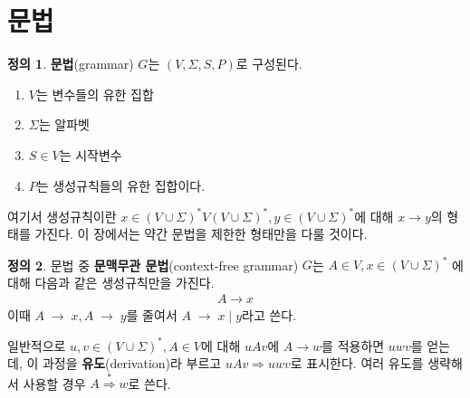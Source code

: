 \documentclass[b5paper, 11pt]{book}
\theoremstyle{definition}
\newtheorem{defn}{정의}[chapter]
\begin{document}
\section{문법}
\begin{defn}
    \textbf{문법}(grammar) $G$는 $(V, \Sigma, S, P)$로 구성된다.
\end{defn} 
\begin{enumerate}
    \item $V$는 변수들의 유한 집합
    \item $\Sigma$는 알파벳
    \item $S \in V$는 시작변수
    \item $P$는 생성규칙들의 유한 집합이다. 
\end{enumerate}
여기서 생성규칙이란 $x\in (V \cup \Sigma)^* V (V \cup \Sigma )^*, y \in (V \cup \Sigma)^*$에 대해 $x \rightarrow y$의 형태를 가진다. 이 장에서는 약간 문법을 제한한 형태만을 다룰 것이다. 
\begin{defn}
문법 중 \textbf{문맥무관 문법}(context-free grammar) $G$는 $A \in V, x \in (V \cup \Sigma)^*$ 에 대해 다음과 같은 생성규칙만을 가진다.
\begin{align*}
    A \rightarrow x
\end{align*}
이때 $A \; \rightarrow \; x, A\; \rightarrow \; y$를 줄여서 $A \; \rightarrow \; x \; \vert \; y $라고 쓴다.
\end{defn} 
일반적으로 $u, v \in (V \cup \Sigma)^*, A \in V$에 대해 $uAv$에 $A \rightarrow w$를 적용하면 $uwv$를 얻는데, 이 과정을 \textbf{유도}(derivation)라 부르고 $uAv \Rightarrow uwv$로 표시한다. 여러 유도를 생략해서 사용할 경우 $A \overset{*}{\Rightarrow} w$로 쓴다. 
\end{document}

